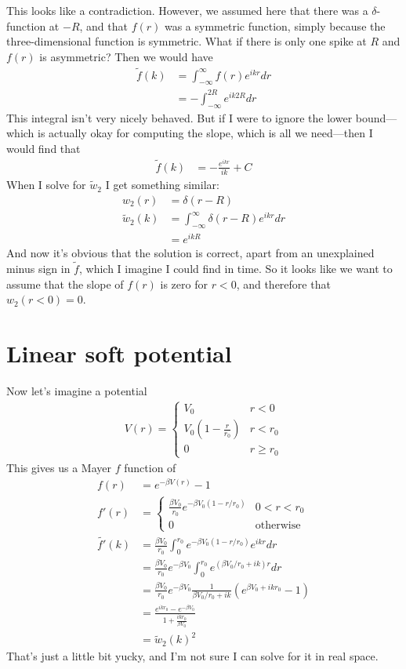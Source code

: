 \documentclass[letterpaper,twocolumn,amsmath,amssymb,prb]{revtex4-1}
\begin{document}
This looks like a contradiction.  However, we assumed here that there
was a $\delta$-function at $-R$, and that $f(r)$ was a symmetric
function, simply because the three-dimensional function is symmetric.
What if there is only one spike at $R$ and $f(r)$ is asymmetric?  Then
we would have
\begin{align}
  \tilde{f}(k) &= \int_{-\infty}^\infty f(r) e^{ikr} dr \\
  &= -\int_{-\infty}^{2R} e^{ik2R} dr
\end{align}
This integral isn't very nicely behaved.  But if I were to ignore the
lower bound---which is actually okay for computing the slope, which is
all we need---then I would find that
\begin{align}
  \tilde{f}(k) &= -\frac{e^{ikr}}{ik} + C
\end{align}
When I solve for $\tilde{w}_2$ I get something similar:
\begin{align}
  w_2(r) &= \delta(r - R) \\
  \tilde{w}_2(k) &= \int_{-\infty}^\infty \delta(r-R) e^{ikr} dr \\
  &= e^{ikR}
\end{align}
And now it's obvious that the solution is correct, apart from an
unexplained minus sign in $\tilde{f}$, which I imagine I could find in
time.  So it looks like we want to assume that the slope of $f(r)$ is
zero for $r<0$, and therefore that $w_2(r<0)=0$.

\section{Linear soft potential}

Now let's imagine a potential
\begin{align}
  V(r) =
  \begin{cases}
    V_0 & r < 0 \\
    V_0\left(1 - \frac{r}{r_0}\right) & r < r_0 \\
    0 & r \ge r_0
  \end{cases}
\end{align}
This gives us a Mayer $f$ function of
\begin{align}
  f(r) &= e^{-\beta V(r)} - 1 \\
  f'(r) &=
  \begin{cases}
    \frac{\beta V_0}{r_0} e^{-\beta V_0(1-r/r_0)} & 0 < r < r_0 \\
    0 & \text{otherwise}
  \end{cases} \\
  \tilde{f'}(k) &= \frac{\beta V_0}{r_0}\int_{0}^{r_0} e^{-\beta
    V_0(1-r/r_0)}e^{ikr}dr \\
  &= \frac{\beta V_0}{r_0}e^{-\beta V_0}
  \int_{0}^{r_0} e^{(\beta V_0/r_0 + ik)r} dr
  \\
  &= \frac{\beta V_0}{r_0}e^{-\beta V_0} \frac{1}{\beta V_0/r_0 + ik}\left(
  e^{\beta V_0+ikr_0} - 1 \right)
  \\
  &= \frac{e^{ikr_0} - e^{-\beta V_0}}{1 + \frac{ikr_0}{\beta V_0}}
  \\
  &= \tilde{w}_2(k)^2
\end{align}
That's just a little bit yucky, and I'm not sure I can solve for it in
real space.
\end{document}
